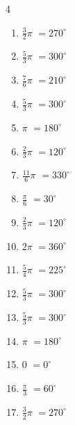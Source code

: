 \begin{multicols}{4}
\begin{enumerate}
  \item $\displaystyle \frac{3}{2}\pi$
        $\displaystyle =270^{\circ}$

  \item $\displaystyle \frac{5}{3}\pi$
        $\displaystyle =300^{\circ}$

  \item $\displaystyle \frac{7}{6}\pi$
        $\displaystyle =210^{\circ}$

  \item $\displaystyle \frac{5}{3}\pi$
        $\displaystyle =300^{\circ}$

  \item $\displaystyle \pi$
        $\displaystyle =180^{\circ}$

  \item $\displaystyle \frac{2}{3}\pi$
        $\displaystyle =120^{\circ}$

  \item $\displaystyle \frac{11}{6}\pi$
        $\displaystyle =330^{\circ}$

  \item $\displaystyle \frac{\pi}{6}$
        $\displaystyle =30^{\circ}$

  \item $\displaystyle \frac{2}{3}\pi$
        $\displaystyle =120^{\circ}$

\columnbreak %

  \item $\displaystyle 2\pi$
        $\displaystyle =360^{\circ}$

  \item $\displaystyle \frac{5}{4}\pi$
        $\displaystyle =225^{\circ}$

  \item $\displaystyle \frac{5}{3}\pi$
        $\displaystyle =300^{\circ}$

  \item $\displaystyle \frac{5}{3}\pi$
        $\displaystyle =300^{\circ}$

  \item $\displaystyle \pi$
        $\displaystyle =180^{\circ}$

  \item $\displaystyle 0$
        $\displaystyle =0^{\circ}$

  \item $\displaystyle \frac{\pi}{3}$
        $\displaystyle =60^{\circ}$

  \item $\displaystyle \frac{3}{2}\pi$
        $\displaystyle =270^{\circ}$


\end{enumerate}
\end{multicols}

